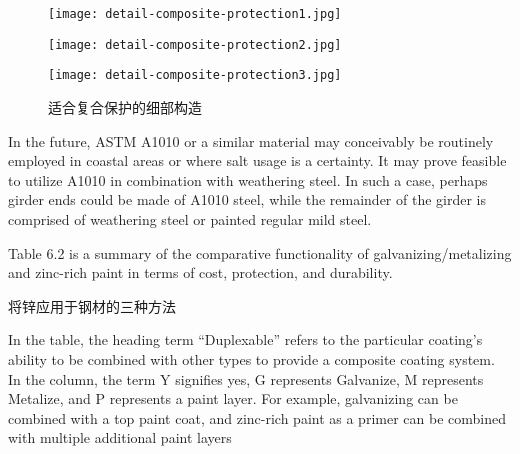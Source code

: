 \begin{figure}
  \begin{minipage}{0.55\linewidth}\centering
    \texttt{[image: detail-composite-protection1.jpg]}
  \end{minipage}%
  \begin{minipage}{0.45\linewidth}\centering
    \texttt{[image: detail-composite-protection2.jpg]}
  \end{minipage}
  \begin{minipage}{\linewidth}\centering
    \texttt{[image: detail-composite-protection3.jpg]}
  \end{minipage}%
  \caption{适合复合保护的细部构造}
  \label{fig:detail-composite-protection}
\end{figure}

In the future, ASTM A1010 or a similar material may conceivably be routinely employed in coastal areas or
where salt usage is a certainty. It may prove feasible to utilize A1010 in combination with weathering steel. In such a
case, perhaps girder ends could be made of A1010 steel, while the remainder of the girder is comprised of weathering
steel or painted regular mild steel.

Table 6.2 is a summary of the comparative functionality of galvanizing/metalizing and zinc-rich paint in terms of
cost, protection, and durability.

\begin{table}
  \caption{将锌应用于钢材的三种方法}
  \label{tab:apply-zinc-to-steel}
\end{table}

In the table, the heading term “Duplexable” refers to the particular coating’s ability to be combined with other
types to provide a composite coating system. In the column, the term Y signifies yes, G represents Galvanize, M
represents Metalize, and P represents a paint layer. For example, galvanizing can be combined with a top paint coat,
and zinc-rich paint as a primer can be combined with multiple additional paint layers

